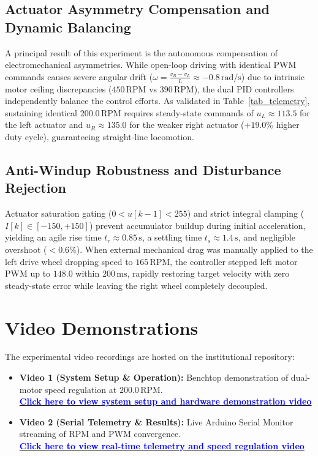\documentclass[11pt,a4paper]{article}
\begin{document}
\vspace{-0.22cm}
\subsection{Actuator Asymmetry Compensation and Dynamic Balancing}
A principal result of this experiment is the autonomous compensation of electromechanical asymmetries. While open-loop driving with identical PWM commands causes severe angular drift ($\omega = \frac{v_R - v_L}{L} \approx -0.8\,\text{rad/s}$) due to intrinsic motor ceiling discrepancies ($450\,\text{RPM}$ vs $390\,\text{RPM}$), the dual PID controllers independently balance the control efforts. As validated in Table~\ref{tab_telemetry}, sustaining identical $200.0\,\text{RPM}$ requires steady-state commands of $u_L \approx 113.5$ for the left actuator and $u_R \approx 135.0$ for the weaker right actuator ($+19.0\%$ higher duty cycle), guaranteeing straight-line locomotion.

\vspace{-0.22cm}
\subsection{Anti-Windup Robustness and Disturbance Rejection}
Actuator saturation gating ($0 < u[k-1] < 255$) and strict integral clamping ($I[k] \in [-150, +150]$) prevent accumulator buildup during initial acceleration, yielding an agile rise time $t_r \approx 0.85\,\text{s}$, a settling time $t_s \approx 1.4\,\text{s}$, and negligible overshoot ($< 0.6\%$). When external mechanical drag was manually applied to the left drive wheel dropping speed to $165\,\text{RPM}$, the controller stepped left motor PWM up to $148.0$ within $200\,\text{ms}$, rapidly restoring target velocity with zero steady-state error while leaving the right wheel completely decoupled.

\vspace{-0.22cm}
\section{Video Demonstrations}
The experimental video recordings are hosted on the institutional repository:
\begin{itemize}[leftmargin=*,noitemsep,topsep=1pt]
    \item \textbf{Video 1 (System Setup \& Operation):} Benchtop demonstration of dual-motor speed regulation at $200.0\,\text{RPM}$. \\
    \href{https://indianinstituteofscience.sharepoint.com/:v:/s/MN2072026-27Aug-Dec/IQCm2DP4zA3YSKBbUy1gOR-KAbL5cDMNcKoGdy2dkqjq_tg?e=n4yNL2}{\textbf{\textcolor{blue}{Click here to view system setup and hardware demonstration video}}}
    \item \textbf{Video 2 (Serial Telemetry \& Results):} Live Arduino Serial Monitor streaming of RPM and PWM convergence. \\
    \href{https://indianinstituteofscience.sharepoint.com/:v:/s/MN2072026-27Aug-Dec/IQD1-QWEAVJZSoE7Pg80yrJSAd0MURNhc1rzrvvtK-n6LIA?e=vrDvOs}{\textbf{\textcolor{blue}{Click here to view real-time telemetry and speed regulation video}}}
\end{itemize}
\end{document}
